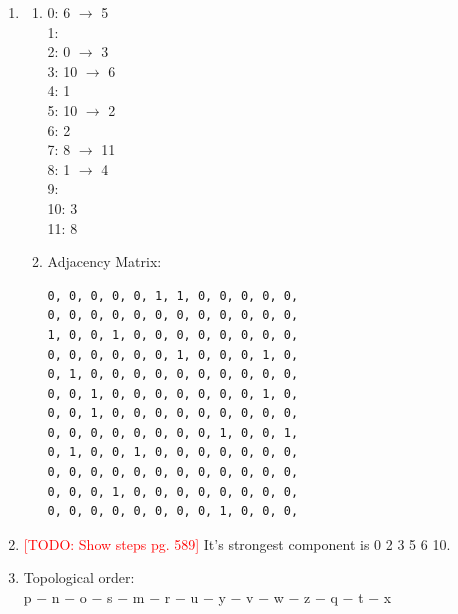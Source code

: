 \documentclass[11pt,fleqn]{article}
\newcommand\todo[1]{\textcolor{red}{[TODO: #1]}}
\begin{document}
\begin{enumerate}
	\item 
		\begin{enumerate}
			\item
0: 6 $\rightarrow$ 5 \\
1: \\
2: 0 $\rightarrow$ 3 \\
3: 10 $\rightarrow$ 6 \\
4: 1 \\
5: 10 $\rightarrow$ 2 \\
6: 2 \\
7: 8 $\rightarrow$ 11 \\
8: 1 $\rightarrow$ 4 \\
9: \\
10: 3 \\
11: 8
			\item Adjacency Matrix:
\begin{verbatim}
0, 0, 0, 0, 0, 1, 1, 0, 0, 0, 0, 0, 
0, 0, 0, 0, 0, 0, 0, 0, 0, 0, 0, 0, 
1, 0, 0, 1, 0, 0, 0, 0, 0, 0, 0, 0, 
0, 0, 0, 0, 0, 0, 1, 0, 0, 0, 1, 0, 
0, 1, 0, 0, 0, 0, 0, 0, 0, 0, 0, 0, 
0, 0, 1, 0, 0, 0, 0, 0, 0, 0, 1, 0, 
0, 0, 1, 0, 0, 0, 0, 0, 0, 0, 0, 0, 
0, 0, 0, 0, 0, 0, 0, 0, 1, 0, 0, 1, 
0, 1, 0, 0, 1, 0, 0, 0, 0, 0, 0, 0, 
0, 0, 0, 0, 0, 0, 0, 0, 0, 0, 0, 0, 
0, 0, 0, 1, 0, 0, 0, 0, 0, 0, 0, 0, 
0, 0, 0, 0, 0, 0, 0, 0, 1, 0, 0, 0, 
\end{verbatim}
		\end{enumerate}
	\item \todo{Show steps pg. 589}
It's strongest component is 0 2 3 5 6 10.
	\item Topological order: \\
p $-$ n $-$ o $-$ s $-$ m $-$ r $-$ u $-$ y $-$ v $-$ w $-$ z $-$ q $-$ t $-$ x 

\newpage


\end{enumerate}
\end{document}
